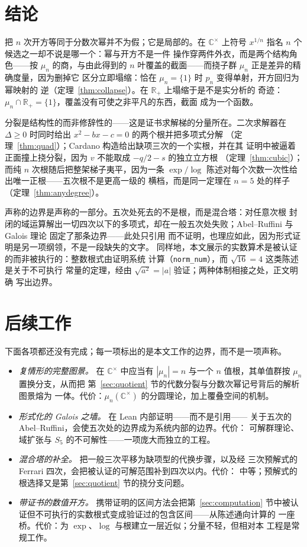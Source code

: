 \documentclass[submission,noinfoline]{jsfds}
\newcommand{\abs}[1]{\lvert #1\rvert}
\begin{document}
\section{结论}\label{sec:conclusion}

把 $n$ 次开方等同于分数次幂并不为假；它是局部的。在 $\mathbb C^\times$
上符号 $x^{1/n}$ 指名 $n$ 个候选之一却不说是哪一个：幂与开方不是一件
操作穿两件外衣，而是两个结构角色——按 $\mu_n$ 的商，与由此得到的
$n$ 叶覆盖的截面——而挠子群 $\mu_n$ 正是差异的精确度量，因为删掉它
区分立即塌缩：恰在 $\mu_n=\{1\}$ 时 $p_n$ 变得单射，开方回归为幂映射的
逆（定理~\ref{thm:collapse}）。在 $\mathbb R_+$ 上塌缩于是不是实分析的
奇迹：$\mu_n\cap\mathbb R_+=\{1\}$，覆盖没有可使之非平凡的东西，截面
成为一个函数。

分裂是结构性的而非修辞性的——这是证书求解梯的分量所在。二次求解器在
$\Delta\ge0$ 时同时给出 $x^2-bx-c=0$ 的两个根并把多项式分解
（定理~\ref{thm:quad}）；Cardano 构造给出缺项三次的一个实根，并在其
证明中被逼着正面撞上挠分裂，因为 $v$ 不能取成 $-q/2-s$ 的独立立方根
（定理~\ref{thm:cubic}）；而纯 $n$ 次根随后把整架梯子夷平，因为一条
$\exp/\log$ 陈述对每个次数一次性给出唯一正根——五次根不是更高一级的
横档，而是同一定理在 $n=5$ 处的样子（定理~\ref{thm:anydegree}）。

声称的边界是声称的一部分。五次处死去的不是根，而是混合塔：对任意次根
封闭的域运算解出一切四次以下的多项式，却在一般五次处失败；Abel--Ruffini
与 Galois 理论 \citep{Abel1824,Galois1846} 固定了那条边界——此处只引用
而不证明，也理应如此，因为形式证明是另一项纲领，不是一段缺失的文字。
同样地，本文展示的实数算术是被认证的而非被执行的：整数根式由证明系统
计算（\texttt{norm\_num}），而 $\sqrt{16}=4$ 这类陈述是关于不可执行
常量的定理，经由 $\sqrt{a^2}=\abs a$ 验证；两种体制相接之处，正文明确
写出边界。

\section{后续工作}\label{sec:future}

下面各项都还没有完成；每一项标出的是本文工作的边界，而不是一项声称。
\begin{itemize}
\item \emph{复情形的完整图景。} 在 $\mathbb C^\times$ 中应当有
$|\mu_n|=n$ 与一个 $n$ 值根，其单值群按 $\mu_n$ 置换分支，从而把
第~\ref{sec:quotient} 节的代数分裂与分数次幂记号背后的解析图景熔为
一体。代价：$\mu_n(\mathbb C^\times)$ 的分圆理论，加上覆叠空间的机制。
\item \emph{形式化的 Galois 之墙。} 在 Lean 内部证明——而不是引用——
关于五次的 Abel--Ruffini，会使五次处的边界成为系统内部的边界。代价：
可解群理论、域扩张与 $S_5$ 的不可解性——一项庞大而独立的工程。
\item \emph{混合塔的补全。} 把一般三次平移为缺项型的代换步骤，以及经
三次预解式的 Ferrari 四次，会把被认证的可解范围补到四次以内。代价：
中等；预解式的根选择又是第~\ref{sec:quotient} 节的挠分支问题。
\item \emph{带证书的数值开方。} 携带证明的区间方法会把第~\ref{sec:computation}
节中被认证但不可执行的实数根式变成验证过的包含区间——从陈述通向计算的
一座桥。代价：为 $\exp$、$\log$ 与根建立一层近似；分量不轻，但相对本
工程是常规工作。
\end{itemize}


\end{document}
